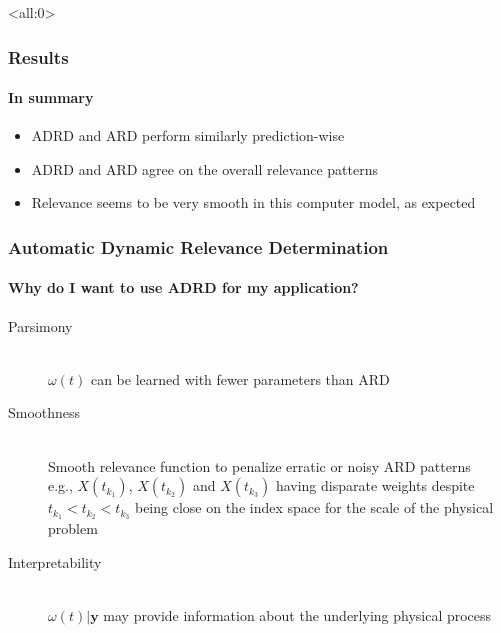 \documentclass{snedecorbeamer}
\begin{document}
\begin{frame}<all:0>
  \frametitle{Results}
  \framesubtitle{In summary}

  \begin{itemize}
  \item \textsc{ADRD} and \textsc{ARD} perform similarly prediction-wise
  \item \textsc{ADRD} and \textsc{ARD} agree on the overall relevance patterns
  \item Relevance seems to be very smooth in this computer model, as expected
  \end{itemize}
\end{frame}

\begin{frame}
  \frametitle{Automatic Dynamic Relevance Determination}
  \framesubtitle{Why do I want to use \textsc{ADRD} for my application?}

  \begingroup
  \begin{description}
  \item[Parsimony] \mbox{}\\
    $\omega(t)$ can be learned with fewer parameters than \textsc{ARD}
  \item[Smoothness] \mbox{}\\
    Smooth relevance function to penalize erratic or noisy \textsc{ARD} patterns
    \\
    e.g., $X(t_{k_1})$, $X(t_{k_2})$ and
    $X(t_{k_3})$ having disparate weights despite $t_{k_1} < t_{k_2} <
    t_{k_3}$ being close on the index space for the scale of the physical
    problem
  \item[Interpretability] \mbox{}\\
    $\omega(t) | \mathbf{y}$ may provide information about the underlying
    physical process
  \end{description}
  \endgroup
\end{frame}
\end{document}
